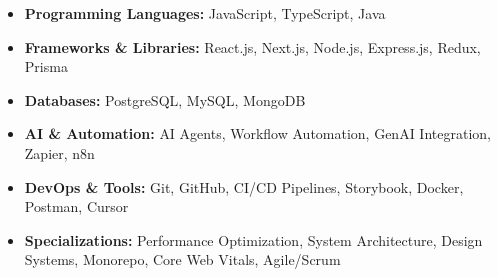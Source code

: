 \documentclass[10pt,a4paper,ragged2e]{altacv}
\begin{document}




\smallskip

\smallskip
\begin{itemize}
\item \textbf{Programming Languages: }\small {JavaScript, TypeScript, Java}\smallskip
  \item \textbf{Frameworks \& Libraries:}\small{ React.js, Next.js, Node.js, Express.js, Redux, Prisma}\smallskip
  \item \textbf{Databases: }\small{PostgreSQL, MySQL, MongoDB}\smallskip
  \item \textbf{AI \& Automation: }\small{AI Agents, Workflow Automation, GenAI Integration, Zapier, n8n}\smallskip
  \item \textbf{DevOps \& Tools: }\small{Git, GitHub, CI/CD Pipelines, Storybook, Docker, Postman, Cursor}\smallskip
  \item \textbf{Specializations: }\small{Performance Optimization, System Architecture, Design Systems, Monorepo, Core Web Vitals, Agile/Scrum}\smallskip
\end{itemize}

\end{document}

